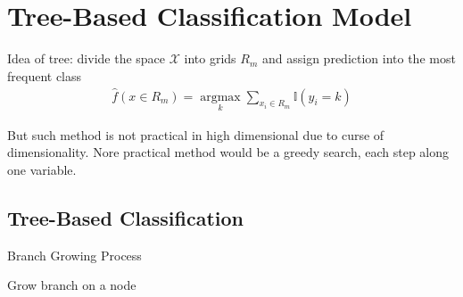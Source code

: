 \section{Tree-Based Classification Model}\label{SubSectionStatLearningTreeMethod}
    Idea of tree: divide the space $ \mathcal{X} $ into grids $ R_m $ and assign prediction into the most frequent class
    \begin{align}
        \hat{f}(x\in R_m)=\mathop{\arg\max}\limits_{k} \sum_{x_i\in R_m}\mathbb{I}(y_i=k)
    \end{align}

    But such method is not practical in high dimensional due to curse of dimensionality. Nore practical method would be a greedy search, each step along one variable.

\subsection{Tree-Based Classification}

\begin{point}
    Branch Growing Process
\end{point}

    Grow branch on a node $  $

